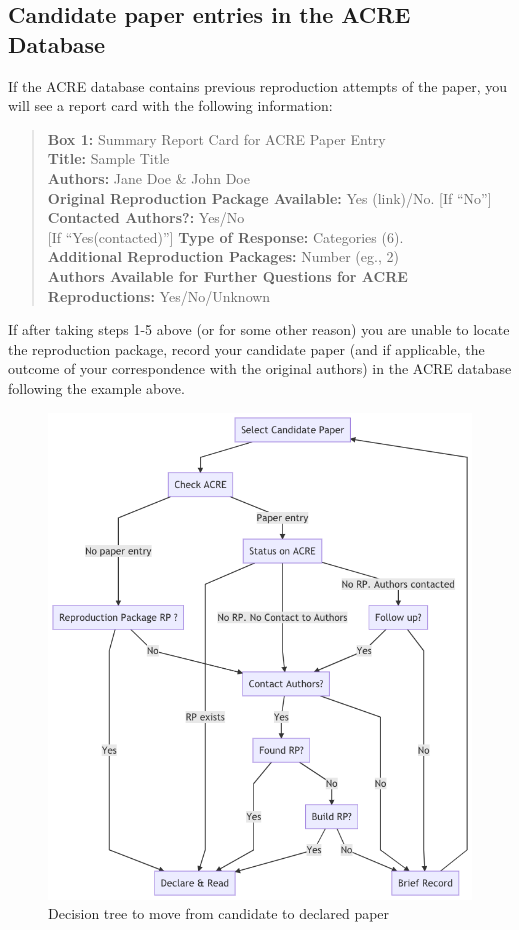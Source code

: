 \documentclass[]{book}
\begin{document}
\hypertarget{check-acre}{%
\subsection{Candidate paper entries in the ACRE Database}\label{check-acre}}

If the ACRE database contains previous reproduction attempts of the paper, you will see a report card with the following information:

\begin{quote}
\textbf{Box 1:} Summary Report Card for ACRE Paper Entry\\
\textbf{Title:} Sample Title\\
\textbf{Authors:} Jane Doe \& John Doe\\
\textbf{Original Reproduction Package Available:} Yes (link)/No.
{[}If ``No''{]} \textbf{Contacted Authors?:} Yes/No\\
{[}If ``Yes(contacted)''{]} \textbf{Type of Response:} Categories (6).\\
\textbf{Additional Reproduction Packages:} Number (eg., 2)\\
\textbf{Authors Available for Further Questions for ACRE Reproductions:} Yes/No/Unknown
\end{quote}

If after taking steps 1-5 above (or for some other reason) you are unable to locate the reproduction package, record your candidate paper (and if applicable, the outcome of your correspondence with the original authors) in the ACRE database following the example above.

\begin{figure}
\includegraphics[width=9.57in]{candidate-to-declared-paper} \caption{Decision tree to move from candidate to declared paper}\label{fig:candidate-paper-dec-tree}
\end{figure}
\end{document}

